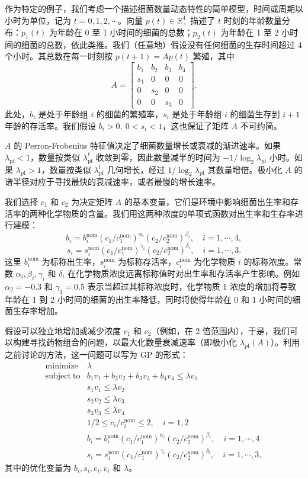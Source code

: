 \documentclass[UTF8, 12pt, fontset=fandol, oneside]{ctexart}
\begin{document}
作为特定的例子，我们考虑一个描述细菌数量动态特性的简单模型，时间或周期以小时为单位，记为 $t=0,1,2,\cdots$。向量 $p(t)\in\mathbb{R}_+^4$ 描述了 $t$ 时刻的年龄数量分布：$p_1(t)$ 为年龄在 0 至 1 小时间的细菌的总数；$p_2(t)$ 为年龄在 1 至 2 小时间的细菌的总数，依此类推。我们（任意地）假设没有任何细菌的生存时间超过 4 个小时。其总数在每一时刻按 $p(t+1)=Ap(t)$ 繁殖，其中
\[
A=
\begin{bmatrix}
b_1 & b_2 & b_3 & b_4\\
s_1 & 0 & 0 & 0\\
0 & s_2 & 0 & 0\\
0 & 0 & s_3 & 0
\end{bmatrix}.
\]
此处，$b_i$ 是处于年龄组 $i$ 的细菌的繁殖率，$s_i$ 是处于年龄组 $i$ 的细菌生存到 $i+1$ 年龄的存活率。我们假设 $b_i>0,\ 0<s_i<1$，这也保证了矩阵 $A$ 不可约简。

$A$ 的 Perron-Frobenius 特征值决定了细菌数量增长或衰减的渐进速率。如果 $\lambda_{\mathrm{pf}}<1$，数量按类似 $\lambda_{\mathrm{pf}}^t$ 收敛到零，因此数量减半的时间为 $-1/\log_2\lambda_{\mathrm{pf}}$ 小时。如果 $\lambda_{\mathrm{pf}}>1$，数量按类似 $\lambda_{\mathrm{pf}}^t$ 几何增长，经过 $1/\log_2\lambda_{\mathrm{pf}}$ 其数量增倍。极小化 $A$ 的谱半径对应于寻找最快的衰减速率，或者最慢的增长速率。

我们选择 $c_1$ 和 $c_2$ 为决定矩阵 $A$ 的基本变量，它们是环境中影响细菌出生率和存活率的两种化学物质的含量。我们用这两种浓度的单项式函数对出生率和生存率进行建模：
\[
b_i=b_i^{\mathrm{nom}}(c_1/c_1^{\mathrm{nom}})^{\alpha_i}(c_2/c_2^{\mathrm{nom}})^{\beta_i},\quad i=1,\cdots,4,
\]
\[
s_i=s_i^{\mathrm{nom}}(c_1/c_1^{\mathrm{nom}})^{\gamma_i}(c_2/c_2^{\mathrm{nom}})^{\delta_i},\quad i=1,\cdots,3.
\]
这里 $b_i^{\mathrm{nom}}$ 为标称出生率，$s_i^{\mathrm{nom}}$ 为标称存活率，$c_i^{\mathrm{nom}}$ 为化学物质 $i$ 的标称浓度。常数 $\alpha_i,\beta_i,\gamma_i$ 和 $\delta_i$ 在化学物质浓度远离标称值时对出生率和存活率产生影响。例如 $\alpha_2=-0.3$ 和 $\gamma_1=0.5$ 表示当超过其标称浓度时，化学物质 1 浓度的增加将导致年龄在 1 到 2 小时间的细菌的出生率降低，同时将使得年龄在 0 和 1 小时间的细菌生存率增加。

假设可以独立地增加或减少浓度 $c_1$ 和 $c_2$（例如，在 2 倍范围内），于是，我们可以构建寻找药物组合的问题，以最大化数量衰减速率（即极小化 $\lambda_{\mathrm{pf}}(A)$）。利用之前讨论的方法，这一问题可以写为 GP 的形式：
\[
\begin{array}{ll}
\mathop{\mathrm{minimize}} & \lambda\\
\mathrm{subject\ to} & b_1v_1+b_2v_2+b_3v_3+b_4v_4\leq \lambda v_1\\
& s_1v_1\leq \lambda v_2\\
& s_2v_2\leq \lambda v_3\\
& s_3v_3\leq \lambda v_4\\
& 1/2\leq c_i/c_i^{\mathrm{nom}}\leq 2,\quad i=1,2\\
& b_i=b_i^{\mathrm{nom}}(c_1/c_1^{\mathrm{nom}})^{\alpha_i}(c_2/c_2^{\mathrm{nom}})^{\beta_i},\quad i=1,\cdots,4\\
& s_i=s_i^{\mathrm{nom}}(c_1/c_1^{\mathrm{nom}})^{\gamma_i}(c_2/c_2^{\mathrm{nom}})^{\delta_i},\quad i=1,\cdots,3,
\end{array}
\]
其中的优化变量为 $b_i,s_i,c_i,v_i$ 和 $\lambda$。
\end{document}
